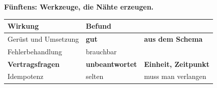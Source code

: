 \begin{aktuell}
\medskip
\textbf{Fünftens: Werkzeuge, die Nähte erzeugen.}

\begin{center}
\renewcommand{\arraystretch}{1.45}
\begin{tabular}{@{}P{3.0cm}P{2.2cm}P{2.6cm}@{}}
\toprule
\textbf{Wirkung} & \textbf{Befund} & \\
\midrule
Gerüst und Umsetzung & \textcolor{gruen}{\textbf{gut}} & \textbf{aus dem Schema}\\
Fehler\-behandlung & \textcolor{mittel}{brauchbar} & \\
\textbf{Vertragsfragen} & \textcolor{akzent}{\textbf{unbeant\-wortet}} & \textcolor{akzent}{\textbf{Einheit, Zeitpunkt}}\\
Idempotenz & \textcolor{akzent}{selten} & \textcolor{akzent}{muss man verlangen}\\
\bottomrule
\end{tabular}
\end{center}

\begin{center}
\begin{minipage}{0.86\textwidth}
\end{minipage}
\end{center}
\end{aktuell}

